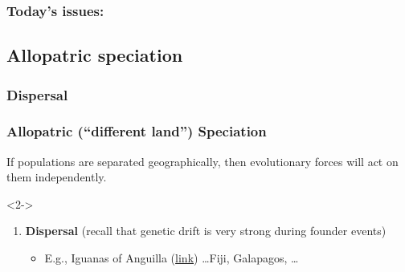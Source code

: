 \begin{noheadline}
\begin{frame}
\frametitle{Today's issues:}
\tableofcontents[currentsection,subsectionstyle=hide]
\end{frame}
\end{noheadline}

\subsection{Allopatric speciation}

\subsubsection{Dispersal}

\begin{frame}[t]
    \frametitle{Allopatric (``different land'') Speciation}
    \vspace{-4mm}
    \begin{adjustwidth}{-2em}{-1.5em}
        If populations are separated geographically, then evolutionary forces
        will act on them independently.
        \begin{uncoverenv}<2->
        \begin{enumerate}
            \item \textbf{Dispersal} (recall that genetic drift is very strong during
                founder events)
                \begin{itemize}
                    \item E.g., Iguanas of Anguilla
                        (\href{http://www.nature.com/news/1998/981015/full/news981015-3.html}{link})
                        \ldots Fiji, Galapagos, \ldots
                \end{itemize}
        \end{enumerate}
        \end{uncoverenv}
    \end{adjustwidth}

\end{frame}

